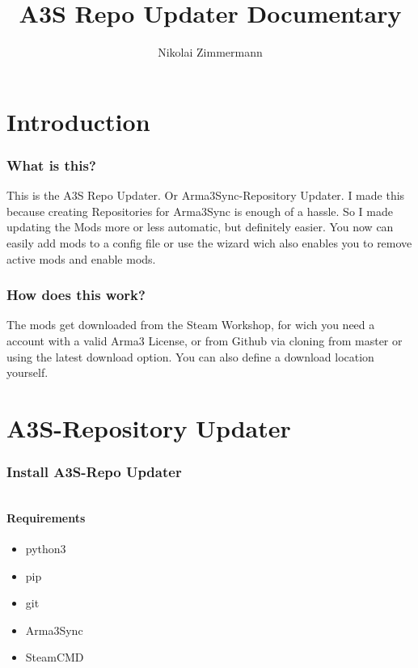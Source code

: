 \documentclass[a4paper]{article}
\title{A3S Repo Updater Documentary}
\author{Nikolai Zimmermann}
\begin{document}
\begin{titlepage}
	\begin{center}
		
	\end{center}
\end{titlepage}
	
	\tableofcontents
	\newpage
	
	\part{Introduction}
		\section{What is this?}
			This is the A3S Repo Updater. Or Arma3Sync-Repository Updater.\newline
			I made this because creating Repositories for Arma3Sync is enough of a hassle. So I made updating the Mods more or less automatic, but definitely easier.	\newline
			You now can easily add mods to a config file or use the wizard wich also enables you to remove active mods and enable mods.
		\section{How does this work?}
			The mods get downloaded from the Steam Workshop, for wich you need a account with a valid Arma3 License, or from Github via cloning from master or using the latest download option.
			You can also define a download location yourself.
	\newpage
	
	\part{A3S-Repository Updater}
		\section{Install A3S-Repo Updater}
			$ $
			\subsection{Requirements}
				\begin{itemize}[noitemsep]
				\item python3
				\item pip
				\item git
				\item Arma3Sync
				\item SteamCMD
				\end{itemize}
\end{document}
